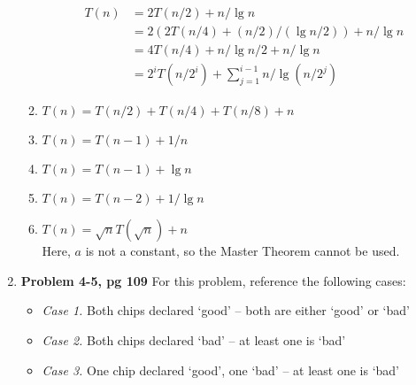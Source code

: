 \documentclass{article}
\begin{document}
\begin{enumerate}
\begin{enumerate}
\begin{align*}
T(n) &= 2T(n/2) + n/\lg{n} \\
& = 2(2T(n/4) + (n/2)/(\lg{n/2})) + n/\lg{n} \\
& = 4T(n/4) + n/\lg{n/2} + n/\lg{n} \\
& = 2^{i}T(n/2^{i}) + \sum_{j=1}^{i-1}{n/\lg(n/2^{j})}
\end{align*}
\item $T(n) = T(n/2) + T(n/4) + T(n/8) + n$ \\ 
\item $T(n) = T(n-1) + 1/n$ \\
\item $T(n) = T(n-1) + \lg{n}$ \\
\item $T(n) = T(n-2) + 1/\lg{n}$ \\
\item $T(n) = \sqrt{n}T(\sqrt{n}) + n$ \\
Here, $a$ is not a constant, so the Master Theorem cannot be used. 
\end{enumerate}
\item \textbf{Problem 4-5, pg 109}
For this problem, reference the following cases:
\begin{itemize}
    \item \emph{Case 1.} Both chips declared `good' -- both are either `good' or `bad'
    \item \emph{Case 2.} Both chips declared `bad' -- at least one is `bad'
    \item \emph{Case 3.} One chip declared `good', one `bad' -- at least one is `bad'
\end{itemize}


\end{enumerate}
\end{document}
